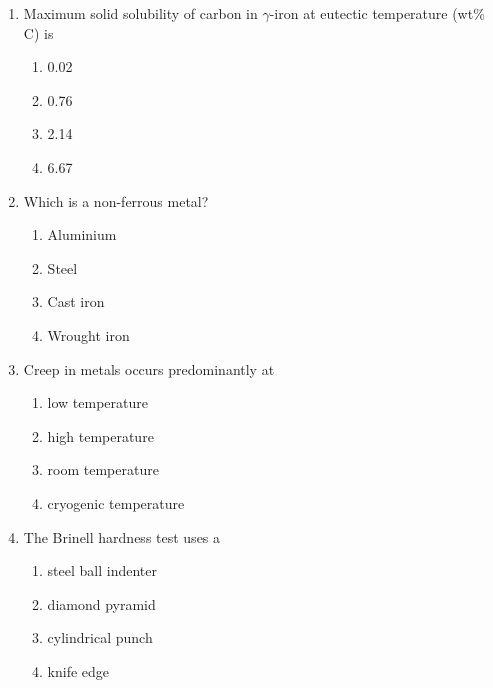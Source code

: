 \documentclass[journal,12pt,onecolumn]{IEEEtran}
\begin{document}
\begin{enumerate}[label=\arabic*)]
\item Maximum solid solubility of carbon in $\gamma$-iron at eutectic temperature (wt\% C) is  
\hfill{} \\

\vspace{0.2cm}
\begin{enumerate}[label=\alph*)]
\item 0.02
\item 0.76
\item 2.14
\item 6.67
\end{enumerate}
\vspace{0.5cm}

\item Which is a non-ferrous metal?  
\hfill{} \\

\vspace{0.2cm}
\begin{enumerate}[label=\alph*)]
\item Aluminium
\item Steel
\item Cast iron
\item Wrought iron
\end{enumerate}
\vspace{0.5cm}

\item Creep in metals occurs predominantly at  
\hfill{} \\

\vspace{0.2cm}
\begin{enumerate}[label=\alph*)]
\item low temperature
\item high temperature
\item room temperature
\item cryogenic temperature
\end{enumerate}
\vspace{0.5cm}

\item The Brinell hardness test uses a  
\hfill{} \\

\vspace{0.2cm}
\begin{enumerate}[label=\alph*)]
\item steel ball indenter
\item diamond pyramid
\item cylindrical punch
\item knife edge
\end{enumerate}


\end{enumerate}
\end{document}
